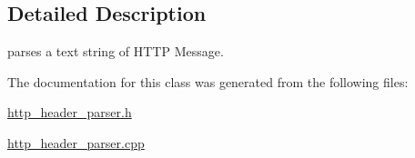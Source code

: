 \subsection{Detailed Description}
parses a text string of H\-T\-T\-P Message. 

The documentation for this class was generated from the following files\-:\begin{DoxyCompactItemize}
\item 
\hyperlink{http__header__parser_8h}{http\-\_\-header\-\_\-parser.\-h}\item 
\hyperlink{http__header__parser_8cpp}{http\-\_\-header\-\_\-parser.\-cpp}\end{DoxyCompactItemize}
